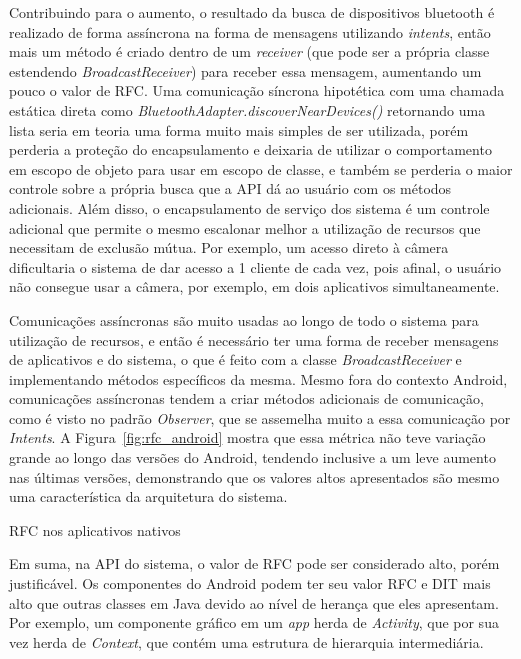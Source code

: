Contribuindo para o aumento, o resultado da busca de dispositivos bluetooth é realizado de forma assíncrona na forma de mensagens utilizando \textit{intents}, então mais um método é criado dentro de um \textit{receiver} (que pode ser a própria classe estendendo \textit{BroadcastReceiver}) para receber essa mensagem, aumentando um pouco o valor de RFC. Uma comunicação síncrona hipotética com uma chamada estática direta como \textit{BluetoothAdapter.discoverNearDevices()} retornando uma lista seria em teoria uma forma muito mais simples de ser utilizada, porém perderia a proteção do encapsulamento e deixaria de utilizar o comportamento em escopo de objeto para usar em escopo de classe, e também se perderia o maior controle sobre a própria busca que a API dá ao usuário com os métodos adicionais. Além disso, o encapsulamento de serviço dos sistema é um controle adicional que permite o mesmo escalonar melhor a utilização de recursos que necessitam de exclusão mútua. Por exemplo, um acesso direto à câmera dificultaria o sistema de dar acesso a 1 cliente de cada vez, pois afinal, o usuário não consegue usar a câmera, por exemplo, em dois aplicativos simultaneamente.

Comunicações assíncronas são muito usadas ao longo de todo o sistema para utilização de recursos, e então é necessário ter uma forma de receber mensagens de aplicativos e do sistema, o que é feito com a classe \textit{BroadcastReceiver} e implementando métodos específicos da mesma. Mesmo fora do contexto Android, comunicações assíncronas tendem a criar métodos adicionais de comunicação, como é visto no padrão \textit{Observer}, que se assemelha muito a essa comunicação por \textit{Intents}. A Figura~\ref{fig:rfc_android} mostra que essa métrica não teve variação grande ao longo das versões do Android, tendendo inclusive a um leve aumento nas últimas versões, demonstrando que os valores altos apresentados são mesmo uma característica da arquitetura do sistema. 

\begin{table}[!htb]
\centering
{}

\caption{RFC nos aplicativos nativos}
\label{tab:rfc_apps}
\end{table}

Em suma, na API do sistema, o valor de RFC pode ser considerado alto, porém justificável. Os componentes do Android podem ter seu valor RFC e DIT mais alto que outras classes em Java devido ao nível de herança que eles apresentam. Por exemplo, um componente gráfico em um \textit{app} herda de \textit{Activity}, que por sua vez herda de \textit{Context}, que contém uma estrutura de hierarquia intermediária.

